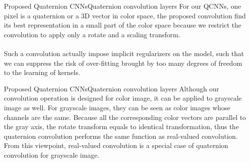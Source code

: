 \documentclass{beamer}
\begin{document}
\begin{frame}{Proposed Quaternion CNNs}{Quaternion convolution layers}
For our QCNNs, one pixel is a quaternion or a 3D vector in color space, the proposed convolution find its best representation in a small part of the color space because we restrict the convolution to apply only a rotate and a scaling transform.
\\~\\
Such a convolution actually impose implicit regularizers on the model, such that we can suppress the risk of over-fitting brought by too many degrees of freedom to the learning of kernels. 
\end{frame}

\begin{frame}{Proposed Quaternion CNNs}{Quaternion convolution layers}
Although our convolution operation is designed for color image, it can be applied to grayscale image as well. For grayscale images, they can be seen as color images whose channels are the same. Because all the corresponding color vectors are parallel to the gray axis, the rotate transform equals to identical transformation, thus the quaternion convolution performs the same function as real-valued convolution. From this viewpoint, real-valued convolution is a special case of quaternion convolution for grayscale image.
\end{frame}

\end{document}
